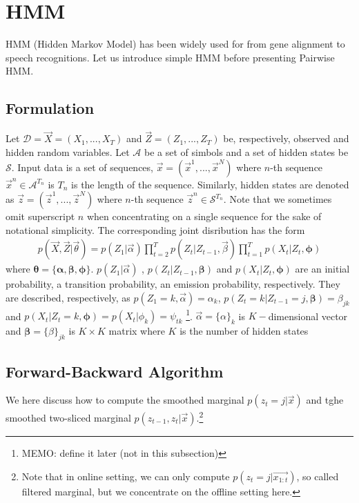 %
%
\section{HMM}
HMM (Hidden Markov Model) has been widely used for from gene alignment to speech recognitions. Let us introduce simple HMM before presenting Pairwise HMM.

\subsection{Formulation}
Let $\mathcal{D}=\vec{X} = (X_1, ..., X_T)$ and $\vec{Z} = (Z_1, ..., Z_T)$ be, respectively, observed and hidden random variables. 
Let $\mathcal{A}$ be a set of simbols and a set of hidden states be $\mathcal{S}$.
Input data is a set of sequences, $\vec{x} = (\vec{x}^1, ..., \vec{x}^{N})$ where $n$-th sequence $\vec{x}^n \in \mathcal{A}^{T_n}$ is $T_n$ is the length of the sequence.
Similarly, hidden states are denoted as $\vec{z} = (\vec{z}^1, ..., \vec{z}^{N})$ where $n$-th sequence $\vec{z}^n \in \mathcal{S}^{T_n}$. Note that we sometimes omit superscript $n$ when concentrating on a single sequence for the sake of notational simplicity.
The corresponding joint disribution has the form
\begin{eqnarray}
  p(\vec{X}, \vec{Z} | \vec{\theta}) = p(Z_1 | \vec{\alpha}) \prod_{t=2}^T p(Z_t|Z_{t-1}, \vec{\beta}) \prod_{t=1}^T p(X_t | Z_t, \mathbf{\phi})
\end{eqnarray}
where $\mathbf{\theta} = \{\mathbf{\alpha}, \mathbf{\beta}, \mathbf{\phi} \}$. $p(Z_1| \vec{\alpha})$ , $p(Z_t|Z_{t-1}, \mathbf{\beta})$ and $p(X_t|Z_t, \mathbf{\phi})$ are an initial probability, a transition probability, an emission probability, respectively.
They are described, respectively, as $p(Z_1 = k, \vec{\alpha}) = \alpha_k$, $p(Z_t = k|Z_{t-1}=j, \mathbf{\beta}) = \beta_{jk}$ and $p(X_t|Z_t = k, \mathbf{\phi}) = p(X_t|\phi_k) = \psi_{tk}$ \footnote{MEMO: define it later (not in this subsection)}. 
$\vec{\alpha} = \{\alpha\}_k$ is $K-$dimensional vector and $\mathbf{\beta} = \{\beta\}_{jk}$ is $K \times K$ matrix where $K$ is the number of hidden states

\subsection{Forward-Backward Algorithm}
We here discuss how to compute the smoothed marginal $p(z_t = j| \vec{x})$ and tghe smoothed two-sliced marginal $p(z_{t-1},z_t| \vec{x})$.\footnote{Note that in online setting, we can only compute $p(z_t = j| \vec{x_{1:t}})$, so called filtered marginal, but we concentrate on the offline setting here.}

